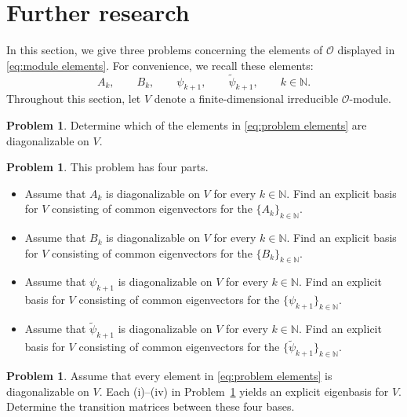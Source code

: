 \documentclass[11pt]{article}%
\theoremstyle{definition}
\newtheorem{problem}[definition]{Problem}
\theoremstyle{plain}
\begin{document}
\section{Further research}\label{Sec:future-research}

In this section, we give three problems concerning the elements of $\mathcal{O}$ displayed in \eqref{eq:module elements}.
For convenience, we recall these elements:
\begin{equation}\label{eq:problem elements}
	A_k, \qquad B_k, \qquad \psi_{k+1}, \qquad \tilde\psi_{k+1}, \qquad k\in\mathbb{N}.
\end{equation}
Throughout this section, let $V$ denote a finite-dimensional irreducible $\mathcal{O}$-module.

\begin{problem}\label{prob1}
Determine which of the elements in \eqref{eq:problem elements} are diagonalizable on $V$.
\end{problem}

\begin{problem}\label{prob2}
This problem has four parts.
\begin{itemize}
	\item[(i)]
	Assume that $A_k$ is diagonalizable on $V$ for every $k\in\mathbb{N}$.
	Find an explicit basis for $V$ consisting of common eigenvectors for the $\{A_k\}_{k \in \mathbb{N}}$.

	\item[(ii)]
	Assume that $B_k$ is diagonalizable on $V$ for every $k\in\mathbb{N}$.
	Find an explicit basis for $V$ consisting of common eigenvectors for the $\{B_k\}_{k \in \mathbb{N}}$.

	\item[(iii)]
	Assume that $\psi_{k+1}$ is diagonalizable on $V$ for every $k\in\mathbb{N}$.
	Find an explicit basis for $V$ consisting of common eigenvectors for the $\{\psi_{k+1}\}_{k \in \mathbb{N}}$. 

	\item[(iv)]
	Assume that $\tilde\psi_{k+1}$ is diagonalizable on $V$ for every $k\in\mathbb{N}$.
	Find an explicit basis for $V$ consisting of common eigenvectors for the $\{\tilde\psi_{k+1}\}_{k \in \mathbb{N}}$.
\end{itemize}
\end{problem}

\begin{problem}\label{prob3}
Assume that every element in \eqref{eq:problem elements} is diagonalizable on $V$.
Each {\rm(i)}--{\rm(iv)} in Problem~\ref{prob2} yields an explicit eigenbasis for $V$.
Determine the transition matrices between these four bases.
\end{problem}
\end{document}
